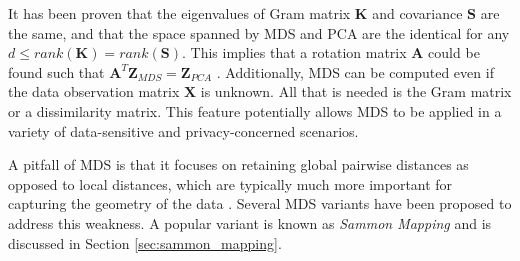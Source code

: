 It has been proven that the eigenvalues of Gram matrix $\bm{K}$ and covariance $\bm{S}$ are the same, and that the space spanned by MDS and PCA are the identical for any $d \leq rank(\bm{K}) = rank(\bm{S})$.  This implies that a rotation matrix $\bm{A}$ could be found such that $\bm{A}^{T}\bm{Z}_{MDS} = \bm{Z}_{PCA}$ \citep{Sorzano2014DRReview}.  Additionally, MDS can be computed even if the data observation matrix $\bm{X}$ is unknown.  All that is needed is the Gram matrix or a dissimilarity matrix.  This feature potentially allows MDS to be applied in a variety of data-sensitive and privacy-concerned scenarios. 

A pitfall of MDS is that it focuses on retaining global pairwise distances as opposed to local distances, which are typically much more important for capturing the geometry of the data \citep{VanDerMaaten2009DRReview}.  Several MDS variants have been proposed to address this weakness.  A popular variant is known as \textit{Sammon Mapping} and is discussed in Section \ref{sec:sammon_mapping}. 

